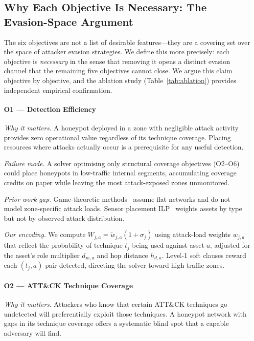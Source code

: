 \documentclass[journal]{IEEEtran}
\begin{document}
\subsection{Why Each Objective Is Necessary: The Evasion-Space Argument}
\label{sec:model:objectives}

The six objectives are not a list of desirable features---they
are a covering set over the space of attacker evasion strategies.
We define this more precisely: each objective is \emph{necessary}
in the sense that removing it opens a distinct evasion channel that
the remaining five objectives cannot close. We argue this claim
objective by objective, and the ablation study (Table~\ref{tab:ablation})
provides independent empirical confirmation.

\paragraph{O1 --- Detection Efficiency}
\textit{Why it matters.}
A honeypot deployed in a zone with negligible attack activity provides
zero operational value regardless of its technique coverage. Placing
resources where attacks actually occur is a prerequisite for any
useful detection.

\textit{Failure mode.}
A solver optimising only structural coverage objectives (O2--O6)
could place honeypots in low-traffic internal segments, accumulating
coverage credits on paper while leaving the most attack-exposed
zones unmonitored.

\textit{Prior work gap.}
Game-theoretic methods~\cite{kiekintveld2015,pawlick2019} assume flat
networks and do not model zone-specific attack loads. Sensor placement
ILP~\cite{saha2015} weights assets by type but not by observed attack
distribution.

\textit{Our encoding.}
We compute $W_{j,a}=\tilde{w}_{j,a}(1+\sigma_j)$ using attack-load
weights $w_{j,a}$ that reflect the probability of technique $t_j$
being used against asset $a$, adjusted for the asset's role
multiplier $d_{m,a}$ and hop distance $h_{d,a}$. Level-1 soft clauses
reward each $(t_j,a)$ pair detected, directing the solver toward
high-traffic zones.

\paragraph{O2 --- ATT\&CK Technique Coverage}
\textit{Why it matters.}
Attackers who know that certain ATT\&CK techniques go undetected will
preferentially exploit those techniques. A honeypot network with gaps
in its technique coverage offers a systematic blind spot that a
capable adversary will find.
\end{document}
